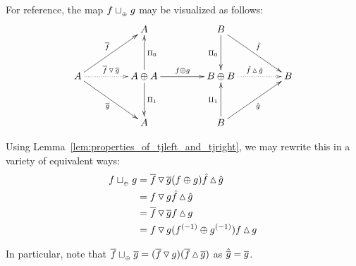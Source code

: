 For reference, the map $f \sqcup_{{_{\oplus}}} g$ may be visualized as follows:
\[
  \xymatrix@C+20pt @R+10pt{
    &A
      & B  \ar[dr]^{\rg{f}} \ar[d]_{\cpa}\\
    A \ar[ur]^{\rst{f}} \ar@{.>}[r]^{\rst{f}\tjleft \rst{g}} \ar[dr]_{\rst{g}}
      & A\+A \ar[u]_{\Pi_0} \ar[d]^{\Pi_1}
        \ar[r]^{f\+g}
       &B\+B \ar@{.>}[r]^{\rg{f}\tjright\rg{g}} & B\\
    & A & B\ar[ur]_{\rg{g}} \ar[u]^{\cpb}
  }
\]

Using Lemma~\ref{lem:properties_of_tjleft_and_tjright}, we may rewrite this in a variety of
equivalent ways:
\begin{align*}
  f \sqcup_{{_{\oplus}}} g &= \overline{f}\operatorname{\triangledown}\overline{g} (f\oplus g) \hat{f}\operatorname{\vartriangle}\hat{g} \\
  &= f \operatorname{\triangledown} g \hat{f}\operatorname{\vartriangle}\hat{g}\\
  & = \overline{f}\operatorname{\triangledown}\overline{g}  f\operatorname{\vartriangle} g\\
  & = f \operatorname{\triangledown} g ({f}^{(-1)}\oplus{g}^{(-1)})f\operatorname{\vartriangle} g
\end{align*}

In particular, note that $\overline{f}\sqcup_{{_{\oplus}}} \overline{g} = (\overline{f} \operatorname{\triangledown} {g}) (\overline{f}\operatorname{\vartriangle}\overline{g})$ as
$\hat{\overline{g}} = \overline{g}$.

